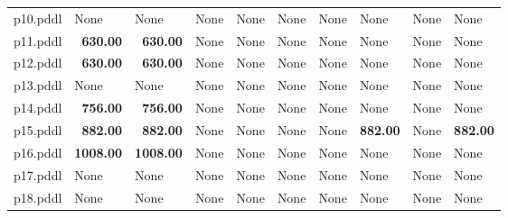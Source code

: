\documentclass{article}
\begin{document}
\begin{tabular}{@{}lrrrrrrrrr@{}}
p10.pddl & \multicolumn{1}{|l|}{None} & \multicolumn{1}{|l|}{None} & \multicolumn{1}{|l|}{None} & \multicolumn{1}{|l|}{None} & \multicolumn{1}{|l|}{None} & \multicolumn{1}{|l|}{None} & \multicolumn{1}{|l|}{None} & \multicolumn{1}{|l|}{None} & \multicolumn{1}{|l|}{None} \\
p11.pddl & \textbf{630.00} & \textbf{630.00} & \multicolumn{1}{|l|}{None} & \multicolumn{1}{|l|}{None} & \multicolumn{1}{|l|}{None} & \multicolumn{1}{|l|}{None} & \multicolumn{1}{|l|}{None} & \multicolumn{1}{|l|}{None} & \multicolumn{1}{|l|}{None} \\
p12.pddl & \textbf{630.00} & \textbf{630.00} & \multicolumn{1}{|l|}{None} & \multicolumn{1}{|l|}{None} & \multicolumn{1}{|l|}{None} & \multicolumn{1}{|l|}{None} & \multicolumn{1}{|l|}{None} & \multicolumn{1}{|l|}{None} & \multicolumn{1}{|l|}{None} \\
p13.pddl & \multicolumn{1}{|l|}{None} & \multicolumn{1}{|l|}{None} & \multicolumn{1}{|l|}{None} & \multicolumn{1}{|l|}{None} & \multicolumn{1}{|l|}{None} & \multicolumn{1}{|l|}{None} & \multicolumn{1}{|l|}{None} & \multicolumn{1}{|l|}{None} & \multicolumn{1}{|l|}{None} \\
p14.pddl & \textbf{756.00} & \textbf{756.00} & \multicolumn{1}{|l|}{None} & \multicolumn{1}{|l|}{None} & \multicolumn{1}{|l|}{None} & \multicolumn{1}{|l|}{None} & \multicolumn{1}{|l|}{None} & \multicolumn{1}{|l|}{None} & \multicolumn{1}{|l|}{None} \\
p15.pddl & \textbf{882.00} & \textbf{882.00} & \multicolumn{1}{|l|}{None} & \multicolumn{1}{|l|}{None} & \multicolumn{1}{|l|}{None} & \multicolumn{1}{|l|}{None} & \textbf{882.00} & \multicolumn{1}{|l|}{None} & \textbf{882.00} \\
p16.pddl & \textbf{1008.00} & \textbf{1008.00} & \multicolumn{1}{|l|}{None} & \multicolumn{1}{|l|}{None} & \multicolumn{1}{|l|}{None} & \multicolumn{1}{|l|}{None} & \multicolumn{1}{|l|}{None} & \multicolumn{1}{|l|}{None} & \multicolumn{1}{|l|}{None} \\
p17.pddl & \multicolumn{1}{|l|}{None} & \multicolumn{1}{|l|}{None} & \multicolumn{1}{|l|}{None} & \multicolumn{1}{|l|}{None} & \multicolumn{1}{|l|}{None} & \multicolumn{1}{|l|}{None} & \multicolumn{1}{|l|}{None} & \multicolumn{1}{|l|}{None} & \multicolumn{1}{|l|}{None} \\
p18.pddl & \multicolumn{1}{|l|}{None} & \multicolumn{1}{|l|}{None} & \multicolumn{1}{|l|}{None} & \multicolumn{1}{|l|}{None} & \multicolumn{1}{|l|}{None} & \multicolumn{1}{|l|}{None} & \multicolumn{1}{|l|}{None} & \multicolumn{1}{|l|}{None} & \multicolumn{1}{|l|}{None} \\

\end{tabular}
\end{document}
